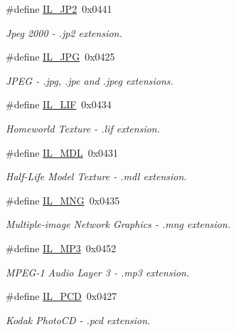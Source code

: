 \begin{DoxyCompactItemize}
\#define \hyperlink{group__il__formats_gac75f592e2adb874fa0e07c1e251a1410}{I\+L\+\_\+\+J\+P2}~0x0441
\begin{DoxyCompactList}\small\item\em Jpeg 2000 -\/ .jp2 extension. \end{DoxyCompactList}\item 
\#define \hyperlink{group__il__formats_ga8ec94b2e3c2c499b3f8024ca1c3e6872}{I\+L\+\_\+\+J\+P\+G}~0x0425
\begin{DoxyCompactList}\small\item\em J\+P\+E\+G -\/ .jpg, .jpe and .jpeg extensions. \end{DoxyCompactList}\item 
\#define \hyperlink{group__il__formats_ga046e1a13b4099c0e53ead2423612aa5b}{I\+L\+\_\+\+L\+I\+F}~0x0434
\begin{DoxyCompactList}\small\item\em Homeworld Texture -\/ .lif extension. \end{DoxyCompactList}\item 
\#define \hyperlink{group__il__formats_ga77ffd8f2fe9aada605897068f3ac8ad1}{I\+L\+\_\+\+M\+D\+L}~0x0431
\begin{DoxyCompactList}\small\item\em Half-\/\+Life Model Texture -\/ .mdl extension. \end{DoxyCompactList}\item 
\#define \hyperlink{group__il__formats_gaa1c28f0b33674565bd4a9291ac0488d4}{I\+L\+\_\+\+M\+N\+G}~0x0435
\begin{DoxyCompactList}\small\item\em Multiple-\/image Network Graphics -\/ .mng extension. \end{DoxyCompactList}\item 
\#define \hyperlink{group__il__formats_ga79d0df78986bbc3e2a8317cc22d2d0ed}{I\+L\+\_\+\+M\+P3}~0x0452
\begin{DoxyCompactList}\small\item\em M\+P\+E\+G-\/1 Audio Layer 3 -\/ .mp3 extension. \end{DoxyCompactList}\item 
\#define \hyperlink{group__il__formats_gabbf7912521d845cc4d4a476153809f5e}{I\+L\+\_\+\+P\+C\+D}~0x0427
\begin{DoxyCompactList}\small\item\em Kodak Photo\+C\+D -\/ .pcd extension. \end{DoxyCompactList}\item 

\end{DoxyCompactItemize}
